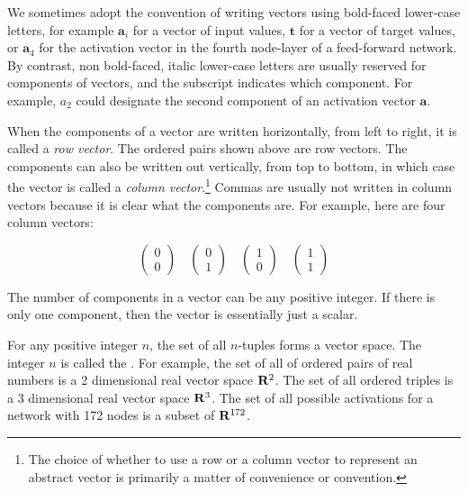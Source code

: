    We sometimes adopt the convention of writing vectors using bold-faced 
lower-case letters, for example $\mathbf{a}_i$ for a  vector of input values, 
$\mathbf{t}$ for a vector of target values, or $\mathbf{a}_4$ for the 
activation vector in the fourth node-layer of a feed-forward network. By 
contrast, non bold-faced, italic lower-case letters are usually reserved for 
components of vectors, and the subscript indicates which component. For 
example, $a_2$ could designate the second component of an activation vector 
$\mathbf{a}$.

When the components of a vector are written horizontally, from left to right,
it is called a {\em row vector}. The ordered pairs shown above are row 
vectors. The components can also be written out vertically, from top to 
bottom, in which case the vector is called a {\em column vector}.\footnote{The choice of whether
to use a row or a column vector to represent an abstract vector is primarily a matter of 
convenience or convention.} Commas are usually 
not written in column vectors because it is clear what the components are. For 
example, here are four column vectors:
\begin{small}
\begin{equation*}
\begin{pmatrix}
0 \\
0
\end{pmatrix} 
\quad 
\begin{pmatrix}
0 \\
1
\end{pmatrix} 
\quad 
\begin{pmatrix}
1 \\
0
\end{pmatrix} 
\quad 
\begin{pmatrix}
1 \\
1
\end{pmatrix} 
\end{equation*}
\end{small}
The number of components in a vector can be any positive integer. If there is
only one component, then the vector is essentially just a scalar.

   For any positive integer $n$, the set of all $n$-tuples forms a vector space.
The integer $n$ is called the . For 
example, the set of all of ordered pairs of real numbers is a 2 dimensional 
real vector space ${\bf R}^2$. The set of all ordered triples is a 3 dimensional real 
vector space ${\bf R}^3$. The set of all possible activations for a network with 172 nodes is a subset of  ${\bf R}^{172}$.

